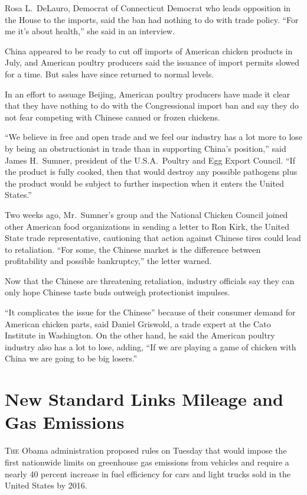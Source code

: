 ﻿\documentclass[12pt]{article}
\begin{document}
Rosa L.~DeLauro, Democrat of Connecticut Democrat who leads opposition in the House to the imports,
said the ban had nothing to do with trade policy. ``For me it's about health,'' she said in an
interview.

China appeared to be ready to cut off imports of American chicken products in July, and American
poultry producers said the issuance of import permits slowed for a time. But sales have since
returned to normal levels.

In an effort to assuage\cite{assuage} Beijing, American poultry producers have made it clear that
they have nothing to do with the Congressional import ban and say they do not fear competing with
Chinese canned or frozen chickens.

``We believe in free and open trade and we feel our industry has a lot more to lose by being an
obstructionist in trade than in supporting China's position,'' said James H.~Sumner, president of
the U.S.A.~Poultry and Egg Export Council. ``If the product is fully cooked, then that would destroy
any possible pathogens plus the product would be subject to further inspection when it enters the
United States.''

Two weeks ago, Mr.~Sumner's group and the National Chicken Council joined other American food
organizations in sending a letter to Ron Kirk, the United State trade representative, cautioning
that action against Chinese tires could lead to retaliation. ``For some, the Chinese market is the
difference between profitability and possible bankruptcy,'' the letter warned.

Now that the Chinese are threatening retaliation, industry officials say they can only hope Chinese
taste buds outweigh protectionist impulses.

``It complicates the issue for the Chinese'' because of their consumer demand for American chicken
parts, said Daniel Griswold, a trade expert at the Cato Institute in Washington. On the other hand,
he said the American poultry industry also has a lot to lose, adding, ``If we are playing a game of
chicken with China we are going to be big losers.''

\section{New Standard Links Mileage and Gas Emissions}

\lettrine{T}{he} Obama administration proposed rules on Tuesday that would impose the first
nationwide limits on greenhouse gas emissions from vehicles and require a nearly 40 percent increase
in fuel efficiency for cars and light trucks sold in the United States by 2016.
\end{document}
